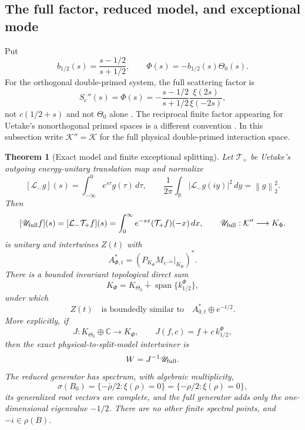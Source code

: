 \documentclass[11pt]{amsart}
\newtheorem{theorem}{Theorem}[section]
\theoremstyle{definition}
\theoremstyle{remark}
\DeclareMathOperator{\spanop}{span}
\newcommand{\C}{\mathbb C}
\newcommand{\R}{\mathbb R}
\newcommand{\Kcal}{\mathcal K}
\newcommand{\norm}[1]{\left\lVert #1\right\rVert}
\newcommand{\abs}[1]{\left\lvert #1\right\rvert}
\begin{document}
\subsection{The full factor, reduced model, and exceptional mode}

Put
\[
 b_{1/2}(s)=\frac{s-1/2}{s+1/2},
 \qquad \Phi(s)=-b_{1/2}(s)\Theta_0(s).
\]
For the orthogonal double-primed system, the full scattering factor is
\begin{equation}\label{eq:full-scattering}
 S_c''(s)=\Phi(s)=-\frac{s-1/2}{s+1/2}
                     \frac{\xi(2s)}{\xi(-2s)},
\end{equation}
not $c(1/2+s)$ and not $\Theta_0$ alone
\cite[p.~111]{Uetake2007}.  The reciprocal finite factor appearing for
Uetake's nonorthogonal primed spaces is a different convention
\cite[pp.~117--118]{Uetake2007}.
In this subsection write $\Kcal''=\Kcal$ for the full physical
double-primed interaction space.

\begin{theorem}[Exact model and finite exceptional splitting]
\label{thm:exact-model}
Let $\mathcal T_+$ be Uetake's outgoing energy-unitary translation map and
normalize
\[
 [\mathcal L_-g](s)=\int_{-\infty}^0e^{s\tau}g(\tau)\,d\tau,
 \qquad
 \frac1{2\pi}\int_\R\abs{\mathcal L_-g(iy)}^2\,dy=\norm g_2^2.
\]
Then
\begin{equation}\label{eq:U-full}
 [\mathscr U_{\rm full}f](s)
 =[\mathcal L_-\mathcal T_+f](s)
 =\int_0^\infty e^{-sx}(\mathcal T_+f)(-x)\,dx,
 \qquad
 \mathscr U_{\rm full}:\Kcal''\longrightarrow K_\Phi.
\end{equation}
is unitary and intertwines $Z(t)$ with
\[
 A_{\Phi,t}^*
 =\left(P_{K_\Phi}M_{e^{-ts}}|_{K_\Phi}\right)^*.
\]
There is a bounded invariant topological direct sum
\begin{equation}\label{eq:model-splitting}
 K_\Phi=K_{\Theta_0}\dotplus\spanop\{k_{1/2}^{\Phi}\},
\end{equation}
under which
\begin{equation}\label{eq:model-intertwining}
 Z(t)\quad\text{is boundedly similar to}\quad
 A_{0,t}^*\oplus e^{-t/2}.
\end{equation}
More explicitly, if
\[
 J:K_{\Theta_0}\oplus\C\longrightarrow K_\Phi,
 \qquad J(f,c)=f+c\,k_{1/2}^{\Phi},
\]
then the exact physical-to-split-model intertwiner is
\begin{equation}\label{eq:exact-W}
 W=J^{-1}\mathscr U_{\rm full}.
\end{equation}
The reduced generator has spectrum, with algebraic multiplicity,
\begin{equation}\label{eq:model-spectrum}
 \sigma(B_0)=\{-\bar\rho/2:\xi(\rho)=0\}
             =\{-\rho/2:\xi(\rho)=0\},
\end{equation}
its generalized root vectors are complete, and the full generator adds only
the one-dimensional eigenvalue $-1/2$.  There are no other finite spectral
points, and $-i\in\rho(B)$.
\end{theorem}
\end{document}

